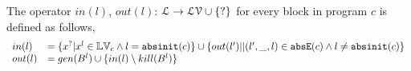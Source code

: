 The operator  $in(l)$, $out(l)$: $ \mathcal{L} \to \mathcal{LV} \cup \{?\}$ for every block in program $c$ is defined as follows,
 \[
 \begin{array}{ll}
    in(l)  & = \{ x^{?} | x^l \in \mathbb{LV}_c \land  l = \mathtt{abs}{\mathtt{init}}(c) \}  
    \cup \{ out(l')|  | (l',\_, l) \in \mathtt{abs}{\mathtt{E}}(c) \land  l \neq \mathtt{abs}{\mathtt{init}}(c)\}  \\
     out(l)  & =  gen(B^{l}) \cup \{ in(l) \setminus kill(B^l)  \}  
 \end{array}
 \]
